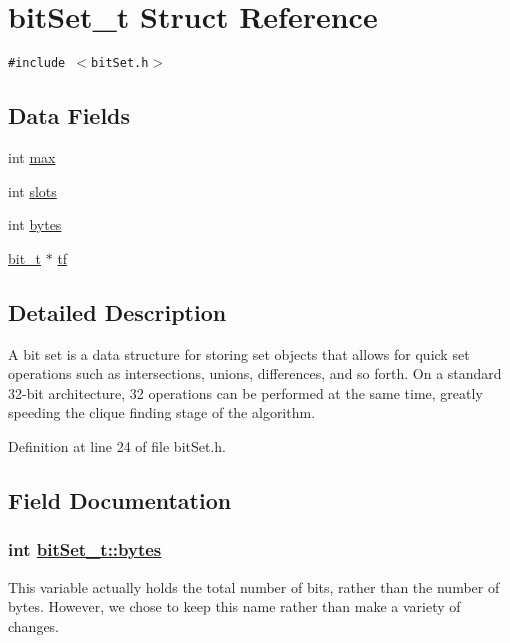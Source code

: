\hypertarget{structbitSet__t}{
\section{bit\-Set\_\-t Struct Reference}
\label{structbitSet__t}
}
{\tt \#include $<$bit\-Set.h$>$}

\subsection*{Data Fields}
\begin{CompactItemize}
\item 
int \hyperlink{structbitSet__t_o0}{max}
\item 
int \hyperlink{structbitSet__t_o1}{slots}
\item 
int \hyperlink{structbitSet__t_o2}{bytes}
\item 
\hyperlink{bitSet_8h_a9}{bit\_\-t} $\ast$ \hyperlink{structbitSet__t_o3}{tf}
\end{CompactItemize}


\subsection*{Detailed Description}
A bit set is a data structure for storing set objects that allows for quick set operations such as intersections, unions, differences, and so forth. On a standard 32-bit architecture, 32 operations can be performed at the same time, greatly speeding the clique finding stage of the algorithm.



Definition at line 24 of file bit\-Set.h.

\subsection*{Field Documentation}
\hypertarget{structbitSet__t_o2}{
\subsubsection[bytes]{\setlength{\rightskip}{0pt plus 5cm}int \hyperlink{structbitSet__t_o2}{bit\-Set\_\-t::bytes}}}
\label{structbitSet__t_o2}


This variable actually holds the total number of bits, rather than the number of bytes. However, we chose to keep this name rather than make a variety of changes.

